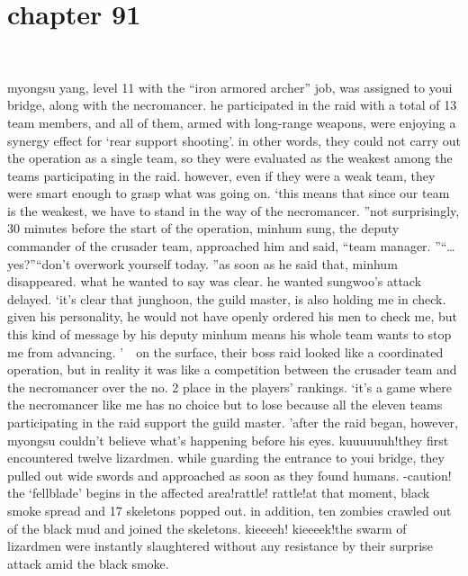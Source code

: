 \section{chapter 91}

                             




myongsu yang, level 11 with the “iron armored archer” job, was assigned to youi bridge, along with the necromancer.
he participated in the raid with a total of 13 team members, and all of them, armed with long-range weapons, were enjoying a synergy effect for ‘rear support shooting’.
in other words, they could not carry out the operation as a single team, so they were evaluated as the weakest among the teams participating in the raid.
 however, even if they were a weak team, they were smart enough to grasp what was going on.
‘this means that since our team is the weakest, we have to stand in the way of the necromancer.
”not surprisingly, 30 minutes before the start of the operation, minhum sung, the deputy commander of the crusader team, approached him and said, “team manager.
”“…yes?”“don’t overwork yourself today.
”as soon as he said that, minhum disappeared.
 what he wanted to say was clear.
 he wanted sungwoo’s attack delayed.
‘it’s clear that junghoon, the guild master, is also holding me in check.
 given his personality, he would not have openly ordered his men to check me, but this kind of message by his deputy minhum means his whole team wants to stop me from advancing.
’  on the surface, their boss raid looked like a coordinated operation, but in reality it was like a competition between the crusader team and the necromancer over the no.
 2 place in the players’ rankings.
‘it’s a game where the necromancer like me has no choice but to lose because all the eleven teams participating in the raid support the guild master.
’after the raid began, however, myongsu couldn’t believe what’s happening before his eyes.
kuuuuuuh!they first encountered twelve lizardmen.
 while guarding the entrance to youi bridge, they pulled out wide swords and approached as soon as they found humans.
-caution! the ‘fellblade’ begins in the affected area!rattle! rattle!at that moment, black smoke spread and 17 skeletons popped out.
 in addition, ten zombies crawled out of the black mud and joined the skeletons.
kieeeeh! kieeeek!the swarm of lizardmen were instantly slaughtered without any resistance by their surprise attack amid the black smoke.

